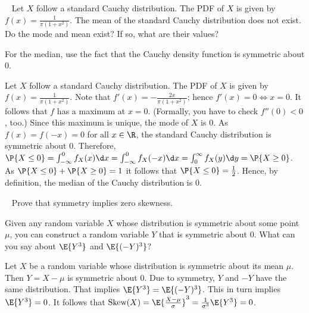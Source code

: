 	\begin{exercise}~
				Let $X$ follow a standard Cauchy distribution. The PDF of $X$ is given by $f(x) = \frac{1}{\pi (1 + x^2)}$.
 			The mean of the standard Cauchy distribution does not exist. Do the mode and mean exist? If so, what are their values?
		\begin{hint}
			For the median, use the fact that the Cauchy density function is symmetric about $0$.
		\end{hint}
		\begin{solution}
			Let $X$ follow a standard Cauchy distribution. The PDF of $X$ is given by $f(x) = \frac{1}{\pi (1 + x^2)}$. Note that $f'(x) = -\frac{2x}{\pi (1 + x^2)}$; hence $f'(x) = 0 \iff x = 0$. It follows that $f$ has a maximum at $x = 0$. (Formally, you have to check $f''(0) < 0$, too.) Since this maximum is unique, the mode of $X$ is $0$. As $f(x) = f(-x) = 0$ for all $x \in \R$, the standard Cauchy distribution is symmetric about $0$. Therefore, $\P{X \leq 0} = \int_{-\infty}^0 f_X(x) \d x = \int_{-\infty}^0 f_X(-x) \d x = \int_0^{\infty} f_X(y) \d y = \P{X \geq 0}$. As $\P{X \leq 0} + \P{X \geq 0} = 1$ it follows that $\P{X \leq 0} = \frac{1}{2}$. Hence, by definition, the median of the Cauchy distribution is $0$.
		\end{solution}
	\end{exercise}
	
	\begin{exercise}~
		Prove that symmetry implies zero skewness.		
		\begin{hint}
			Given any random variable $X$ whose distribution is symmetric about some point $\mu$, you can construct a random variable $Y$ that is symmetric about 0. What can you say about $\E{Y^3}$ and $\E{(-Y)^3}$?
		\end{hint}
		\begin{solution}
			Let $X$ be a random variable whose distribution is symmetric about its mean $\mu$. Then $Y = X - \mu$ is symmetric about 0. Due to symmetry, $Y$ and $-Y$ have the same distribution. That implies $\E{Y^3} = \E{(-Y)^3}$. This in turn implies $\E{Y^3} = 0$. It follows that $\text{Skew}(X) = \E{\frac{X - \mu}{\sigma}}^3 = \frac{1}{\sigma^3} \E{Y^3} = 0$.
		\end{solution}
	\end{exercise}
	
